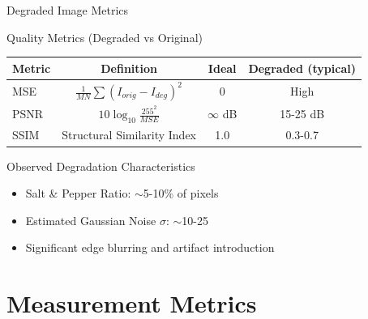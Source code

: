\documentclass[aspectratio=169]{beamer}
\begin{document}
\begin{frame}{Degraded Image Metrics}
    \begin{block}{Quality Metrics (Degraded vs Original)}
        \begin{table}
            \centering
            \begin{tabular}{lccc}
                \toprule
                \textbf{Metric} & \textbf{Definition} & \textbf{Ideal} & \textbf{Degraded (typical)} \\
                \midrule
                MSE & $\frac{1}{MN}\sum(I_{orig} - I_{deg})^2$ & 0 & High \\
                PSNR & $10\log_{10}\frac{255^2}{MSE}$ & $\infty$ dB & 15-25 dB \\
                SSIM & Structural Similarity Index & 1.0 & 0.3-0.7 \\
                \bottomrule
            \end{tabular}
        \end{table}
    \end{block}
    
    \begin{alertblock}{Observed Degradation Characteristics}
        \begin{itemize}
            \item Salt \& Pepper Ratio: $\sim$5-10\% of pixels
            \item Estimated Gaussian Noise $\sigma$: $\sim$10-25
            \item Significant edge blurring and artifact introduction
        \end{itemize}
    \end{alertblock}
\end{frame}

\section{Measurement Metrics}
\end{document}

